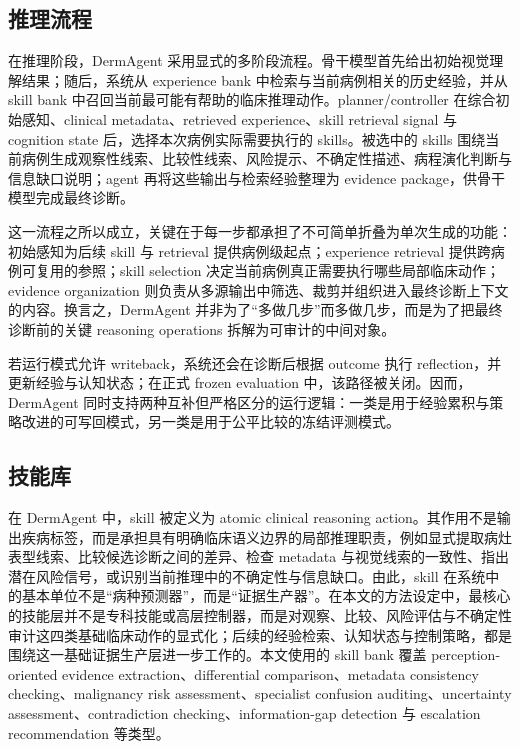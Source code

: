 \documentclass{article}
\begin{document}
\subsection{推理流程}

在推理阶段，DermAgent 采用显式的多阶段流程。骨干模型首先给出初始视觉理解结果；随后，系统从 experience bank 中检索与当前病例相关的历史经验，并从 skill bank 中召回当前最可能有帮助的临床推理动作。planner/controller 在综合初始感知、clinical metadata、retrieved experience、skill retrieval signal 与 cognition state 后，选择本次病例实际需要执行的 skills。被选中的 skills 围绕当前病例生成观察性线索、比较性线索、风险提示、不确定性描述、病程演化判断与信息缺口说明；agent 再将这些输出与检索经验整理为 evidence package，供骨干模型完成最终诊断。

这一流程之所以成立，关键在于每一步都承担了不可简单折叠为单次生成的功能：初始感知为后续 skill 与 retrieval 提供病例级起点；experience retrieval 提供跨病例可复用的参照；skill selection 决定当前病例真正需要执行哪些局部临床动作；evidence organization 则负责从多源输出中筛选、裁剪并组织进入最终诊断上下文的内容。换言之，DermAgent 并非为了“多做几步”而多做几步，而是为了把最终诊断前的关键 reasoning operations 拆解为可审计的中间对象。

若运行模式允许 writeback，系统还会在诊断后根据 outcome 执行 reflection，并更新经验与认知状态；在正式 frozen evaluation 中，该路径被关闭。因而，DermAgent 同时支持两种互补但严格区分的运行逻辑：一类是用于经验累积与策略改进的可写回模式，另一类是用于公平比较的冻结评测模式。

\subsection{技能库}

在 DermAgent 中，skill 被定义为 atomic clinical reasoning action。其作用不是输出疾病标签，而是承担具有明确临床语义边界的局部推理职责，例如显式提取病灶表型线索、比较候选诊断之间的差异、检查 metadata 与视觉线索的一致性、指出潜在风险信号，或识别当前推理中的不确定性与信息缺口。由此，skill 在系统中的基本单位不是“病种预测器”，而是“证据生产器”。在本文的方法设定中，最核心的技能层并不是专科技能或高层控制器，而是对观察、比较、风险评估与不确定性审计这四类基础临床动作的显式化；后续的经验检索、认知状态与控制策略，都是围绕这一基础证据生产层进一步工作的。本文使用的 skill bank 覆盖 perception-oriented evidence extraction、differential comparison、metadata consistency checking、malignancy risk assessment、specialist confusion auditing、uncertainty assessment、contradiction checking、information-gap detection 与 escalation recommendation 等类型。
\end{document}
